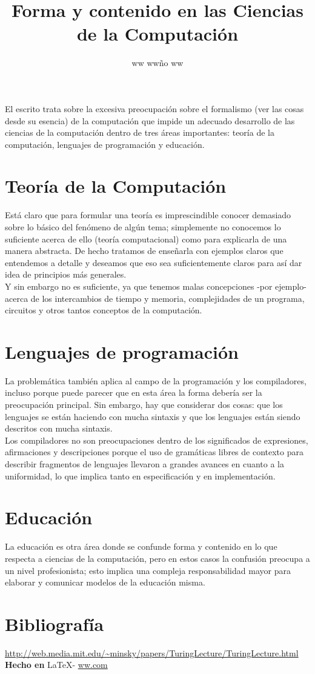 \documentclass{article}
\title{Forma y contenido en las Ciencias de la Computación}
\author{ww ww\~no ww}
\date{} %
\begin{document}
	\maketitle
	\normalsize{
El escrito trata sobre la excesiva preocupación sobre el formalismo (ver las cosas desde su esencia) de la computación que impide un adecuado desarrollo de las ciencias de la computación dentro de tres áreas importantes: teoría de la computación, lenguajes de programación y educación.

\section*{Teoría de la Computación}
Está claro que para formular una teoría es imprescindible conocer demasiado sobre lo básico del fenómeno de algún tema; simplemente no conocemos lo suficiente acerca de ello (teoría computacional) como para explicarla de una manera abstracta. De hecho tratamos de enseñarla con ejemplos claros que entendemos a detalle y deseamos que eso sea suficientemente claros para así dar idea de principios más generales.
\\

Y sin embargo no es suficiente, ya que tenemos malas concepciones -por ejemplo- acerca de los intercambios de tiempo y memoria, complejidades de un programa, circuitos y otros tantos conceptos de la computación.

\section*{Lenguajes de programación}
La problemática también aplica al campo de la programación y los compiladores, incluso porque puede parecer que en esta área la forma debería ser la preocupación principal. Sin embargo, hay que considerar dos cosas: que los lenguajes se están haciendo con mucha sintaxis y que los lenguajes están siendo descritos con mucha sintaxis.
\\

Los compiladores no son preocupaciones dentro de los significados de expresiones, afirmaciones y descripciones porque el uso de gramáticas libres de contexto para describir fragmentos de lenguajes llevaron a grandes avances en cuanto a la uniformidad, lo que implica tanto en especificación y en implementación.

\section*{Educación}
La educación es otra área donde se confunde forma y contenido en lo que respecta a ciencias de la computación, pero en estos casos la confusión preocupa a un nivel profesionista; esto implica una compleja responsabilidad mayor para elaborar y comunicar modelos de la educación misma.
}

\vspace{2cm}

\section*{Bibliograf\'ia}

\noindent \url{http://web.media.mit.edu/~minsky/papers/TuringLecture/TuringLecture.html}
\\

\large{\hfill \textbf{Hecho en } \LaTeX - \url{ww.com}}
\end{document}
